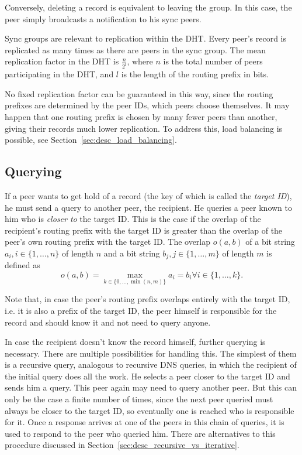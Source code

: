 Conversely, deleting a record is equivalent to leaving the group. In this case,
the peer simply broadcasts a notification to his sync peers.

Sync groups are relevant to replication within the \ac{DHT}. Every peer's record
is replicated as many times as there are peers in the sync group. The mean
replication factor in the \ac{DHT} is $\frac{n}{2^l}$, where $n$ is the total
number of peers participating in the \ac{DHT}, and $l$ is the length of the
routing prefix in bits.

No fixed replication factor can be guaranteed in this way, since the routing
prefixes are determined by the peer IDs, which peers choose themselves. It may
happen that one routing prefix is chosen by many fewer peers than another,
giving their records much lower replication. To address this, load balancing is
possible, see Section~\ref{sec:desc_load_balancing}.

\subsection{Querying}
\label{sec:desc_querying}
If a peer wants to get hold of a record (the key of which is called the
\emph{target ID}), he must send a query to another peer, the recipient. He
queries a peer known to him who is \emph{closer to} the target ID. This is the
case if the overlap of the recipient's routing prefix with the target ID is
greater than the overlap of the peer's own routing prefix with the target ID.
The overlap $o(a, b)$ of a bit string $a_i, i \in \{1, \ldots, n\}$ of length
$n$ and a bit string $b_j, j \in \{1, \ldots, m\}$ of length $m$ is defined as
\[o(a, b) = \max_{k \in \{0, \ldots, \min(n, m)\}} a_i = b_i \forall i \in \{1,
\ldots, k\}.\]

Note that, in case the peer's routing prefix overlaps entirely with the target
ID, i.e. it is also a prefix of the target ID, the peer himself is responsible
for the record and should know it and not need to query anyone.

In case the recipient doesn't know the record himself, further querying is
necessary. There are multiple possibilities for handling this. The simplest of
them is a recursive query, analogous to recursive DNS queries, in which the
recipient of the initial query does all the work. He selects a peer closer to
the target ID and sends him a query. This peer again may need to query another
peer. But this can only be the case a finite number of times, since the next
peer queried must always be closer to the target ID, so eventually one is
reached who is responsible for it. Once a response arrives at one of the peers
in this chain of queries, it is used to respond to the peer who queried him.
There are alternatives to this procedure discussed in
Section~\ref{sec:desc_recursive_vs_iterative}.

